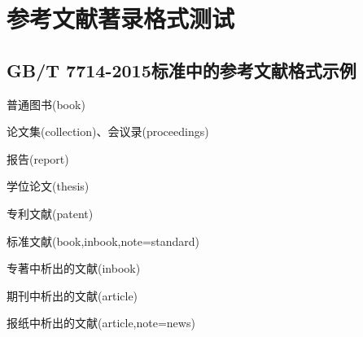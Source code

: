 \section{参考文献著录格式测试}

\subsection{GB/T 7714-2015标准中的参考文献格式示例}\label{sec:eg:gb77142015}

\begin{refsection}
普通图书(book)
\cite{张伯伟2002--}
\cite{2009-155-155}
\cite{胡承正2010-112-112}
\cite{美国妇产科医师学会2010-38-39}
\cite{1962-50-50}
\cite{汪昂1881--}
\cite{蒋有绪1998--}
\cite{中国企业投资协会2013--}
\cite{罗斯基2009--}
\cite{库恩2012--}
\cite{候文顺2010-119-119}
\cite{CRAWFPRD1995--}
\cite{IFLAI1977--}
\cite{OBRIEN1994--}
\cite{Kinchy2012-50-50}
\cite{Praetzellis2011-13-13}

论文集(collection)、会议录(proceedings)
\cite{中国职工教育研究会1985--}
\cite{中国社会科学院台湾史研究中心2012--}
\cite{雷光春2012--}
\cite{陈志勇2011--}
\cite{Babu2014--}

报告(report)
\cite{中华人民共和国国务院新闻办公室2013-04-16--}
\cite{汤万金2013-09-30--}
\cite{Calkin2011-8-9}
\cite{DTFHA1990--}
\cite{WHO1970--}

学位论文(thesis)
\cite{马欢2011-27-27}
\cite{吴云芳2003--}
\cite{CALMS1965--}

专利文献(patent)
\cite{张凯军2012-04-05--}
\cite{河北绿洲生态环境科技有限公司2001--}
\cite{KOSEKI2002--}

标准文献(book,inbook,note=standard)
\cite{全国信息文献标准化技术委员会2010-3-3}
\cite{全国广播电视标准化技术委员会2007-1-1}
\cite{国家环境保护局科技标准司1996-2-3}
\cite{standardinfoiso158}

专著中析出的文献(inbook)
\cite{1988-590-590}
\cite{白书农1998-146-163}
\cite{汪学军2002-22-25}
\cite{国家标准局信息分类编码研究所1988-59-92}
\cite{1977-49-49}
\cite{楼梦麟2011-11-12}
\cite{BUSECK1980-117-211}
\cite{FOURNEY1971-17-38}

期刊中析出的文献(article)
\cite{杨洪升2013-56-75}
\cite{李炳穆2000-5-8}
\cite{于潇2012-1518-1523}
\cite{陈建军2010-93-93}
\cite{DESMARAIS1992-605-609}
\cite{Saito2006-169-176}
\cite{Walls2013-399-418}
\cite{Franz2013-1053-1062}
\cite{Park2010-696-715}

报纸中析出的文献(article,note=news)
\cite{丁文祥2000--}
\cite{张田勤2000--}
\cite{傅刚2000--}
\cite{刘裕国2013-01-12--}


\end{refsection}
